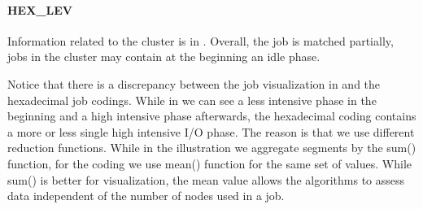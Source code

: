 \documentclass{jhps}
\begin{document}
\FloatBarrier
\paragraph{HEX\_LEV}
Information related to the cluster is in .
Overall, the job is matched partially, jobs in the cluster may contain at the beginning an idle phase.

Notice that there is a discrepancy between the job visualization in  and the hexadecimal job codings.
While in  we can see a less intensive phase in the beginning and a high intensive phase afterwards, the hexadecimal coding contains a more or less single high intensive I/O phase.
The reason is that we use different reduction functions.
While in the illustration we aggregate segments by the sum() function, for the coding we use mean() function for the same set of values.
While sum() is better for visualization, the mean value allows the algorithms to assess data independent of the number of nodes used in a job.
\end{document}
